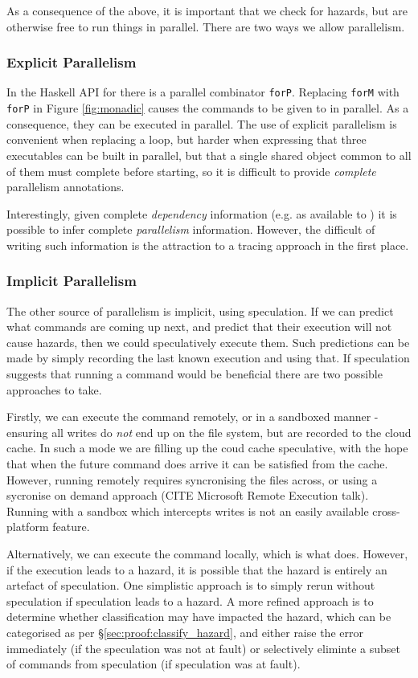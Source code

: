 As a consequence of the above, it is important that we check for hazards, but are otherwise free to run things in parallel. There are two ways we allow parallelism.

\subsubsection{Explicit Parallelism}

In the Haskell API for \Rattle there is a parallel combinator \texttt{forP}. Replacing \texttt{forM} with \texttt{forP} in Figure \ref{fig:monadic} causes the commands to be given to \Rattle in parallel. As a consequence, they can be executed in parallel. The use of explicit parallelism is convenient when replacing a loop, but harder when expressing that three executables can be built in parallel, but that a single shared object common to all of them must complete before starting, so it is difficult to provide \emph{complete} parallelism annotations.

Interestingly, given complete \emph{dependency} information (e.g. as available to \Make) it is possible to infer complete \emph{parallelism} information. However, the difficult of writing such information is the attraction to a tracing approach in the first place.

\subsubsection{Implicit Parallelism}

The other source of parallelism is implicit, using speculation. If we can predict what commands are coming up next, and predict that their execution will not cause hazards, then we could speculatively execute them. Such predictions can be made by simply recording the last known execution and using that. If speculation suggests that running a command would be beneficial there are two possible approaches to take.

Firstly, we can execute the command remotely, or in a sandboxed manner - ensuring all writes do \emph{not} end up on the file system, but are recorded to the cloud cache. In such a mode we are filling up the coud cache speculative, with the hope that when the future command does arrive it can be satisfied from the cache. However, running remotely requires syncronising the files across, or using a sycronise on demand approach (CITE Microsoft Remote Execution talk). Running with a sandbox which intercepts writes is not an easily available cross-platform feature.

Alternatively, we can execute the command locally, which is what \Rattle does. However, if the execution leads to a hazard, it is possible that the hazard is entirely an artefact of speculation. One simplistic approach is to simply rerun without speculation if speculation leads to a hazard. A more refined approach is to determine whether classification may have impacted the hazard, which can be categorised as per \S\ref{sec:proof:classify_hazard}, and either raise the error immediately (if the speculation was not at fault) or selectively eliminte a subset of commands from speculation (if speculation was at fault).
